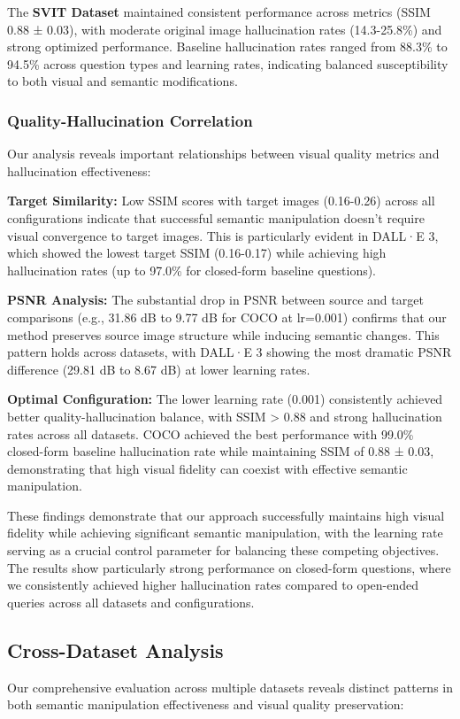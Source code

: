 \documentclass[runningheads]{llncs}
\begin{document}
The \textbf{SVIT Dataset} maintained consistent performance across metrics (SSIM 0.88 ± 0.03), with moderate original image hallucination rates (14.3-25.8\%) and strong optimized performance. Baseline hallucination rates ranged from 88.3\% to 94.5\% across question types and learning rates, indicating balanced susceptibility to both visual and semantic modifications.

\subsubsection{Quality-Hallucination Correlation}
Our analysis reveals important relationships between visual quality metrics and hallucination effectiveness:

\textbf{Target Similarity:} Low SSIM scores with target images (0.16-0.26) across all configurations indicate that successful semantic manipulation doesn't require visual convergence to target images. This is particularly evident in DALL·E 3, which showed the lowest target SSIM (0.16-0.17) while achieving high hallucination rates (up to 97.0\% for closed-form baseline questions).

\textbf{PSNR Analysis:} The substantial drop in PSNR between source and target comparisons (e.g., 31.86 dB to 9.77 dB for COCO at lr=0.001) confirms that our method preserves source image structure while inducing semantic changes. This pattern holds across datasets, with DALL·E 3 showing the most dramatic PSNR difference (29.81 dB to 8.67 dB) at lower learning rates.

\textbf{Optimal Configuration:} The lower learning rate (0.001) consistently achieved better quality-hallucination balance, with SSIM > 0.88 and strong hallucination rates across all datasets. COCO achieved the best performance with 99.0\% closed-form baseline hallucination rate while maintaining SSIM of 0.88 ± 0.03, demonstrating that high visual fidelity can coexist with effective semantic manipulation.

These findings demonstrate that our approach successfully maintains high visual fidelity while achieving significant semantic manipulation, with the learning rate serving as a crucial control parameter for balancing these competing objectives. The results show particularly strong performance on closed-form questions, where we consistently achieved higher hallucination rates compared to open-ended queries across all datasets and configurations.


\subsection{Cross-Dataset Analysis}
Our comprehensive evaluation across multiple datasets reveals distinct patterns in both semantic manipulation effectiveness and visual quality preservation:
\end{document}
